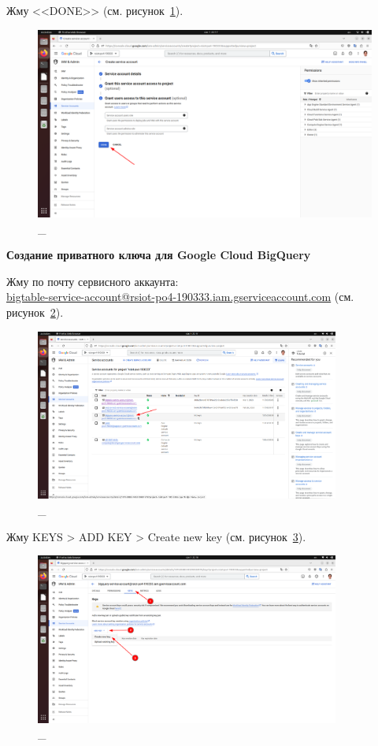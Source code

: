 \documentclass[12pt, a4paper, simple]{eskdtext}
\begin{document}
  Жму <<DONE>> (см. рисунок~\ref{fig:21}).

  \begin{figure}[!h]
    \centering
    \includegraphics[width=18cm]
    {images/GoogleCloudBigQuery/2023-03-01_22-17-30.png}
    \caption{\_}
    \label{fig:21}
  \end{figure}

  \newpage
  \begin{center}
    \textbf{Создание приватного ключа для Google Cloud BigQuery}
  \end{center}

  Жму по почту сервисного аккаунта: \\
  \underline{bigtable-service-account@rsiot-po4-190333.iam.gserviceaccount.com} (см. рисунок~\ref{fig:22}).
  
  \begin{figure}[!h]
    \centering
    \includegraphics[width=10cm]
    {images/GoogleCloudBigQuery/2023-03-01_22-17-52.png}
    \caption{\_}
    \label{fig:22}
  \end{figure}

  Жму KEYS > ADD KEY > Create new key (см. рисунок~\ref{fig:23}).

  \begin{figure}[!h]
    \centering
    \includegraphics[width=10cm]
    {images/GoogleCloudBigQuery/2023-03-01_22-18-26.png}
    \caption{\_}
    \label{fig:23}
  \end{figure}
\end{document}
